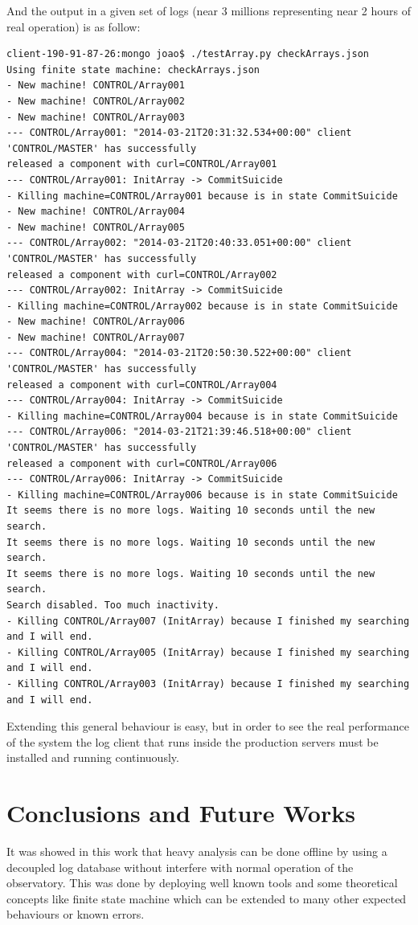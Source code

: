 \documentclass[]{spie}  %
\begin{document}
And the output in a given set of logs (near 3 millions representing near 2 hours of real operation) is as follow:
\begin{verbatim}
client-190-91-87-26:mongo joao$ ./testArray.py checkArrays.json
Using finite state machine: checkArrays.json
- New machine! CONTROL/Array001
- New machine! CONTROL/Array002
- New machine! CONTROL/Array003
--- CONTROL/Array001: "2014-03-21T20:31:32.534+00:00" client 'CONTROL/MASTER' has successfully 
released a component with curl=CONTROL/Array001
--- CONTROL/Array001: InitArray -> CommitSuicide
- Killing machine=CONTROL/Array001 because is in state CommitSuicide
- New machine! CONTROL/Array004
- New machine! CONTROL/Array005
--- CONTROL/Array002: "2014-03-21T20:40:33.051+00:00" client 'CONTROL/MASTER' has successfully 
released a component with curl=CONTROL/Array002
--- CONTROL/Array002: InitArray -> CommitSuicide
- Killing machine=CONTROL/Array002 because is in state CommitSuicide
- New machine! CONTROL/Array006
- New machine! CONTROL/Array007
--- CONTROL/Array004: "2014-03-21T20:50:30.522+00:00" client 'CONTROL/MASTER' has successfully 
released a component with curl=CONTROL/Array004
--- CONTROL/Array004: InitArray -> CommitSuicide
- Killing machine=CONTROL/Array004 because is in state CommitSuicide
--- CONTROL/Array006: "2014-03-21T21:39:46.518+00:00" client 'CONTROL/MASTER' has successfully 
released a component with curl=CONTROL/Array006
--- CONTROL/Array006: InitArray -> CommitSuicide
- Killing machine=CONTROL/Array006 because is in state CommitSuicide
It seems there is no more logs. Waiting 10 seconds until the new search.
It seems there is no more logs. Waiting 10 seconds until the new search.
It seems there is no more logs. Waiting 10 seconds until the new search.
Search disabled. Too much inactivity.
- Killing CONTROL/Array007 (InitArray) because I finished my searching and I will end.
- Killing CONTROL/Array005 (InitArray) because I finished my searching and I will end.
- Killing CONTROL/Array003 (InitArray) because I finished my searching and I will end.
\end{verbatim}

Extending this general behaviour is easy, but in order to see the real
performance of the system the log client that runs inside the production
servers must be installed and running continuously.

\section{Conclusions and Future Works}
It was showed in this work that heavy analysis can be done offline by using a
decoupled log database without interfere with normal operation of the
observatory. This was done by deploying well known tools and some theoretical
concepts like finite state machine which can be extended to many other expected
behaviours or known errors. 
\end{document}
